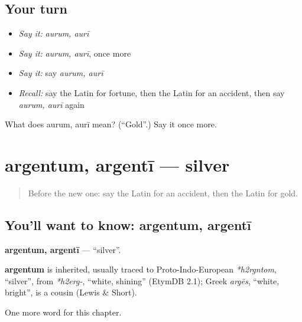 \subsection*{Your turn}
\begin{itemize}
\raggedright
  \item \emph{Say it:} \emph{aurum, aurī}
  \item \emph{Say it:} \emph{aurum, aurī}, once more
  \item \emph{Say it:} say \emph{aurum, aurī}
  \item \emph{Recall:} say the Latin for fortune, then the Latin for an accident, then say \emph{aurum, aurī} again
\end{itemize}

\begin{tcolorbox}[breakable,colback=teal!4,colframe=teal!35!black,title={Before you move on}]
What does aurum, aurī mean? (\textquotedblleft{}Gold\textquotedblright{}.) Say it once more.
\end{tcolorbox}
\section[argentum, argentī]{argentum, argentī — silver}

\label{lesson:LA-C222-argentum}



\begin{quote}
Before the new one: say the Latin for an accident, then the Latin for gold.
\end{quote}

\subsection*{You'll want to know: argentum, argentī}
\textbf{argentum, argentī} — \textquotedblleft{}silver\textquotedblright{}.

\begin{cousinweb}
\textbf{argentum} is inherited, usually traced to Proto-Indo-European \emph{*h2rgntom}, \textquotedblleft{}silver\textquotedblright{}, from \emph{*h2erg-}, \textquotedblleft{}white, shining\textquotedblright{} (EtymDB 2.1); Greek \emph{argēs}, \textquotedblleft{}white, bright\textquotedblright{}, is a cousin (Lewis \& Short).
\end{cousinweb}

\begin{grammarlens}[title={What you've built}]
One more word for this chapter.
\end{grammarlens}

